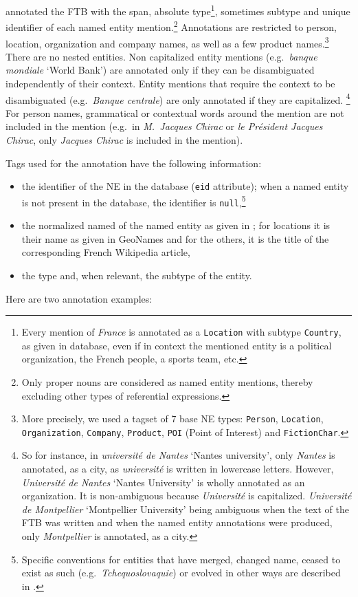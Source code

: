  annotated the FTB with the span, absolute type\footnote{
  Every mention of \emph{France} is annotated as a \texttt{Location} with subtype \texttt{Country}, as given in \aleda database, even if in context the mentioned entity is a political organization, the French people, a sports team, etc.}, sometimes subtype and \aleda unique identifier of each named entity mention.\footnote{Only proper nouns are considered as named entity mentions, thereby excluding other types of referential expressions.} Annotations are restricted to person, location, organization and company names, as well as a few product names.\footnote{More precisely, we used a tagset of 7 base NE types: \texttt{Person}, \texttt{Location}, \texttt{Organization}, \texttt{Company}, \texttt{Product}, \texttt{POI} (Point of Interest) and \texttt{FictionChar}.} There are no nested entities. Non capitalized entity mentions (e.g.~\emph{banque mondiale} `World Bank') are annotated only if they can be disambiguated independently of their context. Entity mentions that require the context to be disambiguated (e.g.~\emph{Banque centrale}) are only annotated if they are capitalized.
  \footnote{So for instance, in \emph{université de Nantes} `Nantes university', only \emph{Nantes} is annotated, as a city, as \emph{université} is written in lowercase letters. However, \emph{Université de Nantes} `Nantes University' is wholly annotated as an organization. It is non-ambiguous because \emph{Université} is capitalized. \emph{Université de Montpellier} `Montpellier University' being ambiguous when the text of the FTB was written and when the named entity annotations were produced, only \emph{Montpellier} is annotated, as a city.}
  For person names, grammatical or contextual words around the mention are not included in the mention (e.g.~in \emph{M.~Jacques Chirac} or \emph{le Président Jacques Chirac}, only \emph{Jacques Chirac} is included in the mention).


Tags used for the annotation have the following information:
\begin{itemize}
\item the identifier of the NE in the \aleda database (\texttt{eid} attribute); when a named entity is not present in the database, the identifier is \texttt{null},\footnote{Specific conventions for entities that have merged, changed name, ceased to exist as such (e.g.~\emph{Tchequoslovaquie}) or evolved in other ways are described in .}
\item the normalized named of the named entity as given in \aleda; for locations it is their name as given in GeoNames and for the others, it is the title of the corresponding French Wikipedia article,
\item the type and, when relevant, the subtype of the entity.
\end{itemize}
Here are two annotation examples:\\

